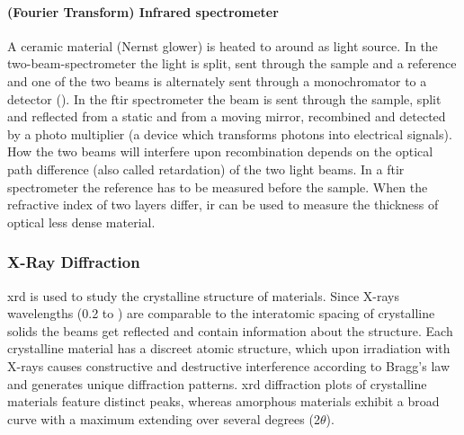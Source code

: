 \paragraph{(Fourier Transform) Infrared spectrometer}
 A ceramic material (Nernst glower) is heated to around  as light source. 
 In the two-beam-spectrometer the light is split, sent through the sample and a reference and one of the two beams is alternately sent through a monochromator to a detector (). 
%
In the \gls{ft}\gls{ir} spectrometer the beam is sent through the sample, split and 
reflected from a static and from a moving mirror, recombined and detected by a photo 
multiplier (a device which transforms photons into electrical signals). 
How the two beams will interfere upon recombination depends on the optical path difference (also called retardation) of the two light beams\cite{Schwedt2008}.
In a \gls{ft}\gls{ir} spectrometer the reference has to be measured before the sample.
%
When the refractive index of two layers differ, \gls{ir} can be used to measure the thickness\cite{Dumin1967} of optical less dense material.




\subsubsection{X-Ray Diffraction}
\gls{xrd} is used to study the crystalline structure of materials.
Since X-rays wavelengths (\num{0.2} to ) are comparable to the interatomic spacing of crystalline solids the beams get reflected and contain information about the structure\cite{Kaliva2020}.
Each crystalline material has a discreet atomic structure, which upon irradiation with 
X-rays causes constructive and destructive interference according to Bragg's law and generates unique diffraction patterns. 
\Gls{xrd} diffraction plots of crystalline materials feature distinct peaks, whereas amorphous materials exhibit a broad curve with a maximum extending over several degrees (2$\theta$).


